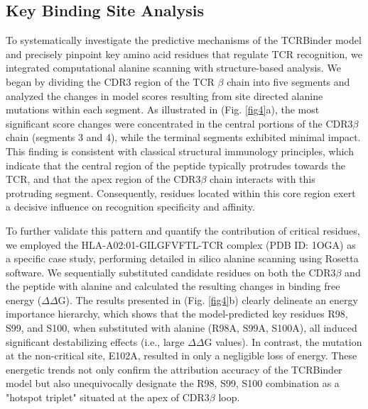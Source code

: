 \documentclass[10pt,letterpaper]{article}
\begin{document}
\subsection*{Key Binding Site Analysis}


To systematically investigate the predictive mechanisms of the TCRBinder model and precisely pinpoint key amino acid residues that regulate TCR recognition, we integrated computational alanine scanning with structure-based analysis. We began by dividing the CDR3 region of the TCR $\beta$ chain into five segments and analyzed the changes in model scores resulting from site directed alanine mutations within each segment. As illustrated in (Fig. \ref{fig4}a), the most significant score changes were concentrated in the central portions of the CDR3$\beta$ chain (segments 3 and 4), while the terminal segments exhibited minimal impact. This finding is consistent with classical structural immunology principles, which indicate that the central region of the peptide typically protrudes towards the TCR, and that the apex region of the CDR3$\beta$ chain interacts with this protruding segment. Consequently, residues located within this core region exert a decisive influence on recognition specificity and affinity.

To further validate this pattern and quantify the contribution of critical residues, we employed the HLA-A02:01-GILGFVFTL-TCR complex (PDB ID: 1OGA) as a specific case study, performing detailed in silico alanine scanning using Rosetta software. We sequentially substituted candidate residues on both the CDR3$\beta$ and the peptide with alanine and calculated the resulting changes in binding free energy ($\Delta$$\Delta$G). The results presented in (Fig. \ref{fig4}b) clearly delineate an energy importance hierarchy, which shows that the model-predicted key residues R98, S99, and S100, when substituted with alanine (R98A, S99A, S100A), all induced significant destabilizing effects (i.e., large $\Delta$$\Delta$G values). In contrast, the mutation at the non-critical site, E102A, resulted in only a negligible loss of energy. These energetic trends not only confirm the attribution accuracy of the TCRBinder model but also unequivocally designate the R98, S99, S100 combination as a "hotspot triplet" situated at the apex of CDR3$\beta$ loop.
\end{document}
